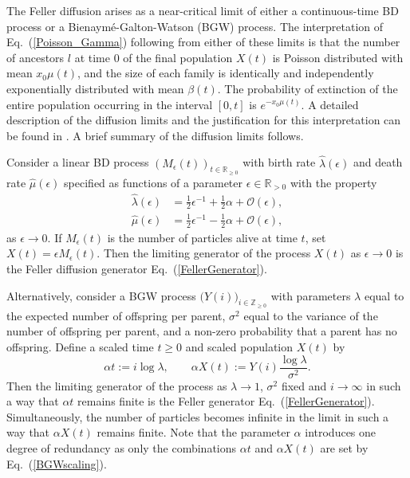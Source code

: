 \documentclass[preprint,12pt]{elsarticle}
\begin{document}
The Feller diffusion arises as a near-critical limit of either a continuous-time BD process or a Bienaym\'{e}-Galton-Watson (BGW) process.  
The interpretation of Eq.~(\ref{Poisson_Gamma}) following from either of these limits is that the number of ancestors $l$ at time $0$ of the final population $X(t)$ 
is Poisson distributed with mean $x_0 \mu(t)$, and the size of each family is identically and independently exponentially distributed with mean $\beta(t)$.  
The probability of extinction of the entire population occurring in the interval $[0, t]$ is $e^{-x_0\mu(t)}$.  A detailed description of 
the diffusion limits and the justification for this interpretation can be found in \citet[Section~2]{BurdenGriffiths24}. A brief summary of the diffusion limits follows.  

Consider a linear BD process $(M_\epsilon(t))_{t \in \mathbb{R}_{\ge 0}}$ with birth rate $\hat\lambda(\epsilon)$ and death rate $\hat \mu(\epsilon)$ specified as functions of a parameter $\epsilon \in \mathbb{R}_{> 0}$ with the property 
\begin{equation}	\label{BDlimit}
\begin{split}
\hat\lambda(\epsilon) &= \tfrac{1}{2} \epsilon^{-1} + \tfrac{1}{2} \alpha + \mathcal{O}(\epsilon), \\
\hat \mu(\epsilon)        &= \tfrac{1}{2}\epsilon^{-1} - \tfrac{1}{2} \alpha + \mathcal{O}(\epsilon), 
\end{split}
\end{equation}
as $\epsilon \to 0$.  
If $M_\epsilon(t)$ is the number of particles alive at time $t$, set $X(t) = \epsilon M_\epsilon(t)$.  
Then the limiting generator of the process $X(t)$ as $\epsilon \to 0$ is the Feller diffusion generator Eq.~(\ref{FellerGenerator}).  

Alternatively, consider a BGW process $\big(Y(i)\big)_{i \in \mathbb{Z}_{\ge 0}}$ with parameters $\lambda$ equal to the 
expected number of offspring per parent, $\sigma^2$ equal to the variance of the number of offspring per parent, and a non-zero probability that a 
parent has no offspring.  Define a scaled time $t \ge 0$ and scaled population $X(t)$ by 
\begin{equation}	\label{BGWscaling}
\alpha t := i \log\lambda, \qquad \alpha X(t) := Y(i) \frac{\log\lambda}{\sigma^2}.  
\end{equation}
Then the limiting generator of the process as $\lambda \to 1$, $\sigma^2$  fixed and $i \to \infty$ in such a way that $\alpha t$ remains finite is the Feller 
generator Eq.~(\ref{FellerGenerator}).  
Simultaneously, the number of particles becomes infinite in the limit in such a way that $\alpha X(t)$ remains finite.  Note that the 
parameter $\alpha$ introduces one degree of redundancy as only the combinations $\alpha t$ and $\alpha X(t)$ are set by Eq.~(\ref{BGWscaling}).  
\end{document}

